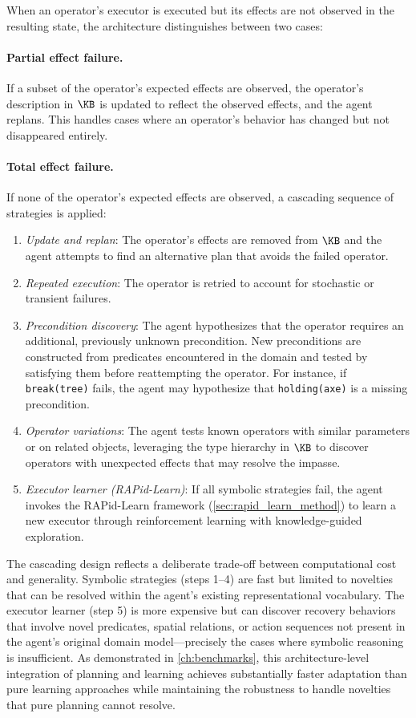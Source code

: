 When an operator's executor is executed but its effects are not observed in the resulting state, the architecture distinguishes between two cases:

\paragraph{Partial effect failure.} If a subset of the operator's expected effects are observed, the operator's description in $\KB$ is updated to reflect the observed effects, and the agent replans. This handles cases where an operator's behavior has changed but not disappeared entirely.

\paragraph{Total effect failure.} If none of the operator's expected effects are observed, a cascading sequence of strategies is applied:
\begin{enumerate}[leftmargin=*]
    \item \emph{Update and replan}: The operator's effects are removed from $\KB$ and the agent attempts to find an alternative plan that avoids the failed operator.
    \item \emph{Repeated execution}: The operator is retried to account for stochastic or transient failures.
    \item \emph{Precondition discovery}: The agent hypothesizes that the operator requires an additional, previously unknown precondition. New preconditions are constructed from predicates encountered in the domain and tested by satisfying them before reattempting the operator. For instance, if \texttt{break(tree)} fails, the agent may hypothesize that \texttt{holding(axe)} is a missing precondition.
    \item \emph{Operator variations}: The agent tests known operators with similar parameters or on related objects, leveraging the type hierarchy in $\KB$ to discover operators with unexpected effects that may resolve the impasse.
    \item \emph{Executor learner (RAPid-Learn)}: If all symbolic strategies fail, the agent invokes the RAPid-Learn framework (\cref{sec:rapid_learn_method}) to learn a new executor through reinforcement learning with knowledge-guided exploration.
\end{enumerate}

The cascading design reflects a deliberate trade-off between computational cost and generality. Symbolic strategies (steps 1--4) are fast but limited to novelties that can be resolved within the agent's existing representational vocabulary. The executor learner (step 5) is more expensive but can discover recovery behaviors that involve novel predicates, spatial relations, or action sequences not present in the agent's original domain model---precisely the cases where symbolic reasoning is insufficient. As demonstrated in \cref{ch:benchmarks}, this architecture-level integration of planning and learning achieves substantially faster adaptation than pure learning approaches while maintaining the robustness to handle novelties that pure planning cannot resolve.